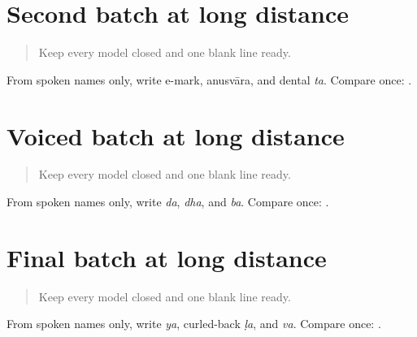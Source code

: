 \section[e / anusvara / ta]{Second batch at long distance}

\label{lesson:MR-R18-script-b-r4}



\begin{quote}
Keep every model closed and one blank line ready.
\end{quote}

\begin{tcolorbox}[breakable,colback=teal!4,colframe=teal!35!black,title={Before you move on}]
From spoken names only, write e-mark, anusvāra, and dental \emph{ta}. Compare once: \textbf{  }.
\end{tcolorbox}
\section[da / dha / ba]{Voiced batch at long distance}

\label{lesson:MR-R18-script-c-r4}



\begin{quote}
Keep every model closed and one blank line ready.
\end{quote}

\begin{tcolorbox}[breakable,colback=teal!4,colframe=teal!35!black,title={Before you move on}]
From spoken names only, write \emph{da}, \emph{dha}, and \emph{ba}. Compare once: \textbf{  }.
\end{tcolorbox}
\section[ya / lla / va]{Final batch at long distance}

\label{lesson:MR-R18-script-d-r4}



\begin{quote}
Keep every model closed and one blank line ready.
\end{quote}

\begin{tcolorbox}[breakable,colback=teal!4,colframe=teal!35!black,title={Before you move on}]
From spoken names only, write \emph{ya}, curled-back \emph{ḷa}, and \emph{va}. Compare once: \textbf{  }.
\end{tcolorbox}
